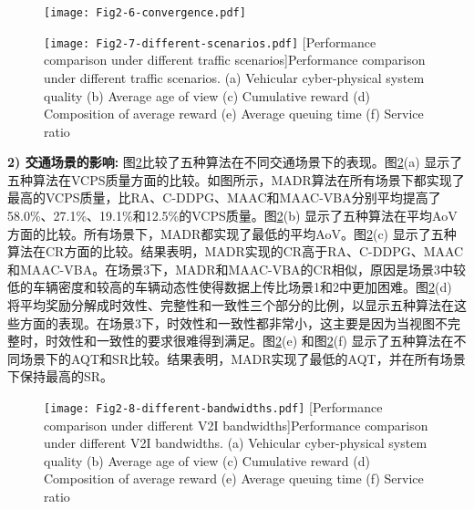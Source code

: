 \begin{figure}[h]
\centering
  \texttt{[image: Fig2-6-convergence.pdf]}
  \label{fig 2-6}
\end{figure} 

\begin{figure}[h]
  \centering
  \texttt{[image: Fig2-7-different-scenarios.pdf]}
  [Performance comparison under different traffic scenarios]{Performance comparison under different traffic scenarios. (a) Vehicular cyber-physical system quality (b) Average age of view (c) Cumulative reward (d) Composition of average reward (e) Average queuing time (f) Service ratio}
  \label{fig 2-7}
\end{figure}

\textbf{2) 交通场景的影响:}
图\ref{fig 2-7}比较了五种算法在不同交通场景下的表现。图\ref{fig 2-7}(a) 显示了五种算法在VCPS质量方面的比较。如图所示，MADR算法在所有场景下都实现了最高的VCPS质量，比RA、C-DDPG、MAAC和MAAC-VBA分别平均提高了58.0\%、27.1\%、19.1\%和12.5\%的VCPS质量。图\ref{fig 2-7}(b) 显示了五种算法在平均AoV方面的比较。所有场景下，MADR都实现了最低的平均AoV。图\ref{fig 2-7}(c) 显示了五种算法在CR方面的比较。结果表明，MADR实现的CR高于RA、C-DDPG、MAAC和MAAC-VBA。在场景3下，MADR和MAAC-VBA的CR相似，原因是场景3中较低的车辆密度和较高的车辆动态性使得数据上传比场景1和2中更加困难。图\ref{fig 2-7}(d) 将平均奖励分解成时效性、完整性和一致性三个部分的比例，以显示五种算法在这些方面的表现。在场景3下，时效性和一致性都非常小，这主要是因为当视图不完整时，时效性和一致性的要求很难得到满足。图\ref{fig 2-7}(e) 和图\ref{fig 2-7}(f) 显示了五种算法在不同场景下的AQT和SR比较。结果表明，MADR实现了最低的AQT，并在所有场景下保持最高的SR。

\begin{figure}[h]
  \centering
  \texttt{[image: Fig2-8-different-bandwidths.pdf]}
  [Performance comparison under different V2I bandwidths]{Performance comparison under different V2I bandwidths. (a) Vehicular cyber-physical system quality (b) Average age of view (c) Cumulative reward (d) Composition of average reward (e) Average queuing time (f) Service ratio}
  \label{fig 2-8}
\end{figure}

